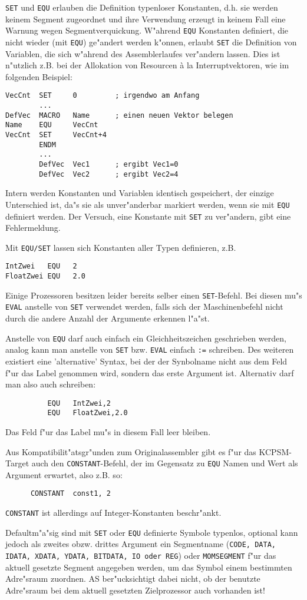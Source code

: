 \documentclass[12pt,a4paper,twoside]{report}
\newcommand{\tty}[1]{{\tt #1}}
\begin{document}
\tty{SET} und \tty{EQU} erlauben die Definition typenloser Konstanten, d.h. sie
werden keinem Segment zugeordnet und ihre Verwendung erzeugt in keinem
Fall eine Warnung wegen Segmentverquickung.  W"ahrend \tty{EQU} Konstanten
definiert, die nicht wieder (mit \tty{EQU}) ge"andert werden k"onnen, erlaubt
\tty{SET} die Definition von Variablen, die sich w"ahrend des Assemblerlaufes
ver"andern lassen.  Dies ist n"utzlich z.B. bei der Allokation von
Resourcen \`a la Interruptvektoren, wie im folgenden Beispiel:
\begin{verbatim}
VecCnt  SET     0         ; irgendwo am Anfang
        ...
DefVec  MACRO   Name      ; einen neuen Vektor belegen
Name    EQU     VecCnt
VecCnt  SET     VecCnt+4
        ENDM
        ...
        DefVec  Vec1      ; ergibt Vec1=0
        DefVec  Vec2      ; ergibt Vec2=4
\end{verbatim}
Intern werden Konstanten und Variablen identisch gespeichert, der
einzige Unterschied ist, da"s sie als unver"anderbar markiert werden, wenn
sie mit \tty{EQU} definiert werden.  Der Versuch, eine Konstante mit
\tty{SET} zu ver"andern, gibt eine Fehlermeldung.
\par
Mit \tty{EQU/SET} lassen sich Konstanten aller Typen definieren, z.B.
\begin{verbatim}
IntZwei   EQU   2
FloatZwei EQU   2.0
\end{verbatim}
Einige Prozessoren besitzen leider bereits selber einen \tty{SET}-Befehl.
Bei diesen mu"s \tty{EVAL} anstelle von \tty{SET} verwendet werden, falls
sich der Maschinenbefehl nicht durch die andere Anzahl der Argumente 
erkennen l"a"st.
\par
Anstelle von \tty{EQU} darf auch einfach ein Gleichheitszeichen geschrieben
werden, analog kann man anstelle von \tty{SET} bzw. \tty{EVAL}
einfach \tty{:=} schreiben.  Des weiteren existiert eine
'alternative' Syntax, bei der der Synbolname nicht aus dem Feld
f"ur das Label genommen wird, sondern das erste Argument ist.
Alternativ darf man also auch schreiben:
\begin{verbatim}
          EQU   IntZwei,2
          EQU   FloatZwei,2.0
\end{verbatim}
Das Feld f"ur das Label mu"s in diesem Fall leer bleiben.
\par
Aus Kompatibilit"atsgr"unden zum Originalassembler gibt es f"ur das
KCPSM-Target auch den {\tt CONSTANT}-Befehl, der im Gegensatz zu {\tt EQU}
Namen und Wert als Argument erwartet, also z.B. so:
\begin{verbatim}
      CONSTANT  const1, 2
\end{verbatim}
{\tt CONSTANT} ist allerdings auf Integer-Konstanten beschr"ankt.
\par
Defaultm"a"sig sind mit \tty{SET} oder \tty{EQU} definierte Symbole
typenlos, optional kann jedoch als zweites obzw. drittes Argument ein
Segmentname (\tty{CODE, DATA, IDATA, XDATA, YDATA, BITDATA, IO oder REG})
oder \tty{MOMSEGMENT} f"ur das aktuell gesetzte Segment angegeben werden,
um das Symbol einem bestimmten Adre"sraum zuordnen.  AS ber"ucksichtigt
dabei nicht, ob der benutzte Adre"sraum bei dem aktuell gesetzten
Zielprozessor auch vorhanden ist!
\end{document}

